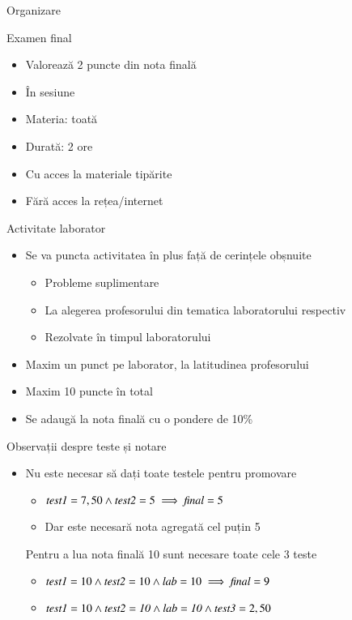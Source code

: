 \documentclass[xcolor=pdftex,romanian,colorlinks]{beamer}
\begin{document}
\begin{section}{Organizare}
\begin{frame}{Examen final}
\begin{itemize}
\item Valorează 2 puncte din nota finală
\item În sesiune
\item Materia: toată
\item Durată: 2 ore
\item Cu acces la materiale tipărite
\item Fără acces la rețea/internet
\end{itemize}
\end{frame}

\begin{frame}{Activitate laborator}
\begin{itemize}
\item Se va puncta activitatea în plus față de cerințele obșnuite
\begin{itemize}
\item Probleme suplimentare
\item La alegerea profesorului din tematica laboratorului respectiv
\item Rezolvate în timpul laboratorului
\end{itemize}
\item Maxim un punct pe laborator, la latitudinea profesorului
\item Maxim 10 puncte în total
\item Se adaugă la nota finală cu o pondere de 10\%
\end{itemize}
\end{frame}

\begin{frame}{Observații despre teste și notare}
\begin{itemize}
\item Nu este necesar să dați toate testele pentru promovare
\begin{itemize}
\item ${\it test1} = 7,50 \wedge {\it test2} =  5 \implies {\it final} = 5$ 
\item Dar este necesară nota agregată cel puțin 5
\end{itemize}
\vitem Pentru a lua nota finală 10 sunt necesare toate cele 3 teste
\begin{itemize}
\item ${\it test1} = 10 \wedge {\it test2} =  10 \wedge {\it lab} =  10 \implies {\it final} = 9$ 
\item ${\it test1} = 10 \wedge {\it test2 =  10} \wedge {\it lab =  10} \wedge {\it test3} = 2,50$


\end{itemize}
\end{itemize}
\end{frame}
\end{section}
\end{document}
